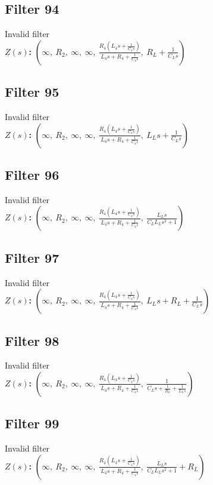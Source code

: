 \documentclass{article}
\begin{document}
\subsection*{Filter 94}
Invalid filter \\ 
\textbf{$Z(s)$:} $\left( \infty, \  R_{2}, \  \infty, \  \infty, \  \frac{R_{4} \left(L_{4} s + \frac{1}{C_{4} s}\right)}{L_{4} s + R_{4} + \frac{1}{C_{4} s}}, \  R_{L} + \frac{1}{C_{L} s}\right)$ \\ 
\subsection*{Filter 95}
Invalid filter \\ 
\textbf{$Z(s)$:} $\left( \infty, \  R_{2}, \  \infty, \  \infty, \  \frac{R_{4} \left(L_{4} s + \frac{1}{C_{4} s}\right)}{L_{4} s + R_{4} + \frac{1}{C_{4} s}}, \  L_{L} s + \frac{1}{C_{L} s}\right)$ \\ 
\subsection*{Filter 96}
Invalid filter \\ 
\textbf{$Z(s)$:} $\left( \infty, \  R_{2}, \  \infty, \  \infty, \  \frac{R_{4} \left(L_{4} s + \frac{1}{C_{4} s}\right)}{L_{4} s + R_{4} + \frac{1}{C_{4} s}}, \  \frac{L_{L} s}{C_{L} L_{L} s^{2} + 1}\right)$ \\ 
\subsection*{Filter 97}
Invalid filter \\ 
\textbf{$Z(s)$:} $\left( \infty, \  R_{2}, \  \infty, \  \infty, \  \frac{R_{4} \left(L_{4} s + \frac{1}{C_{4} s}\right)}{L_{4} s + R_{4} + \frac{1}{C_{4} s}}, \  L_{L} s + R_{L} + \frac{1}{C_{L} s}\right)$ \\ 
\subsection*{Filter 98}
Invalid filter \\ 
\textbf{$Z(s)$:} $\left( \infty, \  R_{2}, \  \infty, \  \infty, \  \frac{R_{4} \left(L_{4} s + \frac{1}{C_{4} s}\right)}{L_{4} s + R_{4} + \frac{1}{C_{4} s}}, \  \frac{1}{C_{L} s + \frac{1}{R_{L}} + \frac{1}{L_{L} s}}\right)$ \\ 
\subsection*{Filter 99}
Invalid filter \\ 
\textbf{$Z(s)$:} $\left( \infty, \  R_{2}, \  \infty, \  \infty, \  \frac{R_{4} \left(L_{4} s + \frac{1}{C_{4} s}\right)}{L_{4} s + R_{4} + \frac{1}{C_{4} s}}, \  \frac{L_{L} s}{C_{L} L_{L} s^{2} + 1} + R_{L}\right)$ \\ 
\end{document}
